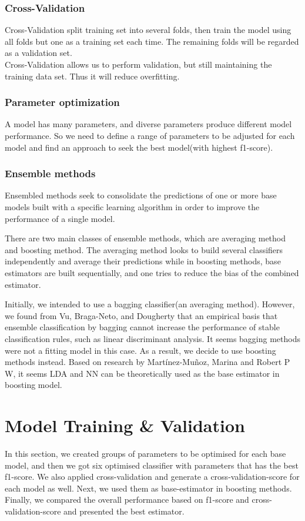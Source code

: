 \documentclass{article}
\begin{document}
\subsubsection{Cross-Validation}
Cross-Validation split training set into several folds, then train the model using all folds but one as a training set each time. The remaining folds will be regarded as a validation set. \\
Cross-Validation allows us to perform validation, but still maintaining the training data set. Thus it will reduce overfitting.

\subsubsection{Parameter optimization}
A model has many parameters, and diverse parameters produce different model performance. So we need to define a range of parameters to be adjusted for each model and find an approach to seek the best model(with highest f1-score).
 
\subsubsection{Ensemble methods}
Ensembled methods seek to consolidate the predictions of one or more base models built with a specific learning algorithm in order to improve the performance of a single model.

There are two main classes of ensemble methods, which are averaging method and boosting method. The averaging method looks to build several classifiers independently and average their predictions while in boosting methods, base estimators are built sequentially, and one tries to reduce the bias of the combined estimator.

Initially, we intended to use a bagging classifier(an averaging method). However, we found from Vu, Braga-Neto, and Dougherty \cite{4}that an empirical basis that ensemble classification by bagging cannot increase the performance of stable classification rules, such as linear discriminant analysis. It seems bagging methods were not a fitting model in this case. As a result, we decide to use boosting methods instead. Based on research by Martínez-Muñoz\cite{3}, Marina and Robert P W\cite{2}, it seems LDA and NN can be theoretically used as the base estimator in boosting model.

\section{Model Training \& Validation}
In this section, we created groups of parameters to be optimised for each base model, and then we got six optimised classifier with parameters that has the best f1-score. We also applied cross-validation and generate a cross-validation-score for each model as well. Next, we used them as base-estimator in boosting methods. Finally, we compared the overall performance based on f1-score and cross-validation-score and presented the best estimator.
\end{document}
